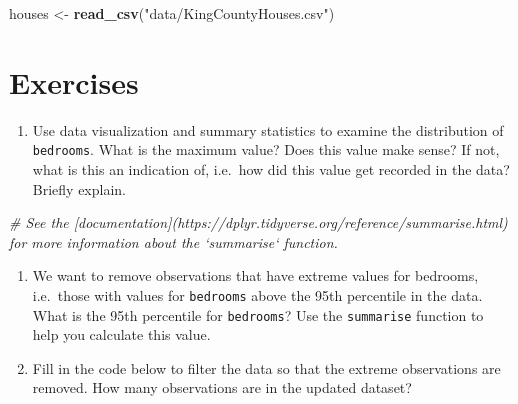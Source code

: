 \documentclass[]{book}
\newenvironment{Shaded}{\begin{snugshade}}{\end{snugshade}}
\newcommand{\KeywordTok}[1]{\textcolor[rgb]{0.13,0.29,0.53}{\textbf{#1}}}
\newcommand{\StringTok}[1]{\textcolor[rgb]{0.31,0.60,0.02}{#1}}
\newcommand{\CommentTok}[1]{\textcolor[rgb]{0.56,0.35,0.01}{\textit{#1}}}
\newcommand{\OperatorTok}[1]{\textcolor[rgb]{0.81,0.36,0.00}{\textbf{#1}}}
\newcommand{\NormalTok}[1]{#1}
\providecommand{\tightlist}{%
  \setlength{\itemsep}{0pt}\setlength{\parskip}{0pt}}
\begin{document}
\begin{Shaded}
\begin{Highlighting}[]
\NormalTok{houses <-}\StringTok{ }\KeywordTok{read_csv}\NormalTok{(}\StringTok{"data/KingCountyHouses.csv"}\NormalTok{)}
\end{Highlighting}
\end{Shaded}

\section{Exercises}\label{exercises-3}

\begin{enumerate}
\def\labelenumi{\arabic{enumi}.}
\tightlist
\item
  Use data visualization and summary statistics to examine the
  distribution of \texttt{bedrooms}. What is the maximum value? Does
  this value make sense? If not, what is this an indication of, i.e.~how
  did this value get recorded in the data? Briefly explain.
\end{enumerate}

\begin{Shaded}
\begin{Highlighting}[]
\CommentTok{# See the [documentation](https://dplyr.tidyverse.org/reference/summarise.html) for more information about the `summarise` function.}
\end{Highlighting}
\end{Shaded}

\begin{enumerate}
\def\labelenumi{\arabic{enumi}.}
\setcounter{enumi}{1}
\item
  We want to remove observations that have extreme values for bedrooms,
  i.e.~those with values for \texttt{bedrooms} above the 95th percentile
  in the data. What is the 95th percentile for \texttt{bedrooms}? Use
  the \texttt{summarise} function to help you calculate this value.
\item
  Fill in the code below to filter the data so that the extreme
  observations are removed. How many observations are in the updated
  dataset?
\end{enumerate}

\begin{Shaded}
\end{Shaded}
\end{document}
